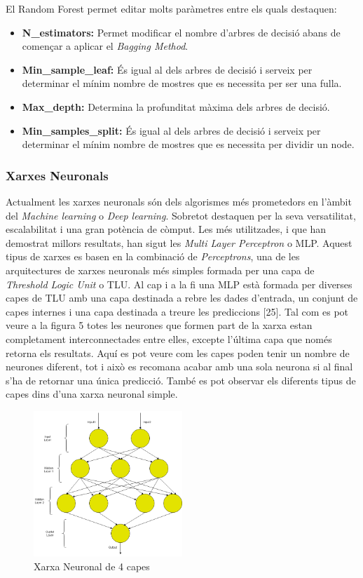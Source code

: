 \documentclass[10pt,a4paper,twocolumn,twoside]{article}
\begin{document}
El Random Forest permet editar molts paràmetres entre els quals destaquen:
\begin{itemize}
\item \textbf{N\_estimators:} Permet modificar el nombre d'arbres de decisió abans de començar a aplicar el \textit{Bagging Method}.
\item \textbf{Min\_sample\_leaf:} És igual al dels arbres de decisió i serveix per determinar el mínim nombre de mostres que es necessita per ser una fulla.
\item \textbf{Max\_depth:} Determina la profunditat màxima dels arbres de decisió.
\item \textbf{Min\_samples\_split:} És igual al dels arbres de decisió i serveix per determinar el mínim nombre de mostres que es necessita per dividir un node.
\end{itemize}

\subsubsection{Xarxes Neuronals}
Actualment les xarxes neuronals són dels algorismes més prometedors en l'àmbit del \textit{Machine learning} o \textit{Deep learning}. Sobretot destaquen per la seva versatilitat, escalabilitat i una gran potència de còmput. Les més utilitzades, i que han demostrat millors resultats, han sigut les \textit{Multi Layer Perceptron} o MLP. Aquest tipus de xarxes es basen en la combinació de \textit{Perceptrons}, una de les arquitectures de xarxes neuronals més simples formada per una capa de \textit{Threshold Logic Unit} o TLU. Al cap i a la fi una MLP està formada per diverses capes de TLU amb una capa destinada a rebre les dades d'entrada, un conjunt de capes internes i una capa destinada a treure les prediccions [25]. Tal com es pot veure a la figura 5 totes les neurones que formen part de la xarxa estan completament interconnectades entre elles, excepte l'última capa que només retorna els resultats. Aquí es pot veure com les capes poden tenir un nombre de neurones diferent, tot i això es recomana acabar amb una sola neurona si al final s'ha de retornar una única predicció. També es pot observar els diferents tipus de capes dins d'una xarxa neuronal simple.
 \begin{figure}[!h]
\centering
	\includegraphics[width=0.5\textwidth]{../img/XarxaNeur}
	\caption{Xarxa Neuronal de 4 capes}
	\label{fig-XarxaNeur}
\end{figure}
\end{document}

